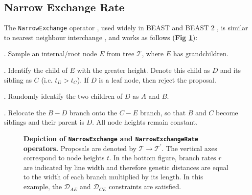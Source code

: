 \documentclass[10pt,letterpaper]{article}
\begin{document}





\clearpage
\subsection*{Narrow Exchange Rate} \label{sect:NER}

The \texttt{NarrowExchange} operator \cite{drummond2002estimating}, used widely in BEAST \cite{drummond2012bayesian,suchard2018bayesian} and BEAST 2 \cite{bouckaert2019beast}, is similar to nearest neighbour interchange \cite{semple2003phylogenetics}, and works as follows (\textbf{Fig \ref{fig:narrowexchange}}):

. Sample an internal/root node $E$ from tree $\mathcal{T}$, where $E$ has grandchildren.

. Identify the child of $E$ with the greater height. Denote this child as $D$ and its sibling as $C$ (i.e. $t_D > t_C$). If $D$ is a leaf node, then reject the proposal.

. Randomly identify the two children of $D$ as $A$ and $B$.

. Relocate the $B-D$ branch onto the $C-E$ branch, so that $B$ and $C$ become siblings and their parent is $D$. All node heights remain constant.


\begin{figure}[!h]
\caption{\textbf{Depiction of \texttt{NarrowExchange} and \texttt{NarrowExchangeRate} operators.} Proposals are denoted by $\mathcal{T} \rightarrow \mathcal{T}^\prime$. The vertical axes correspond to node heights $t$. In the bottom figure, branch rates $r$ are indicated by line width and therefore genetic distances are equal to the width of each branch multiplied by its length. 
In this example, the $\mathcal{D}_{AE}$ and $\mathcal{D}_{CE}$ constraints are satisfied.
}
\label{fig:narrowexchange}
\end{figure}
\end{document}
